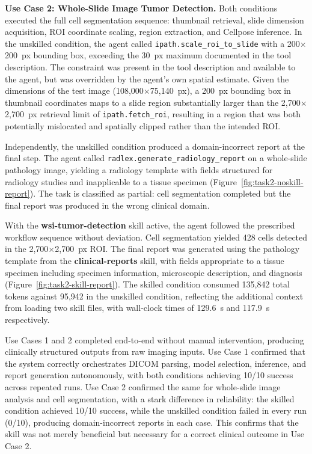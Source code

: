 \documentclass[conference]{IEEEtran}
\begin{document}
\textbf{Use Case 2: Whole-Slide Image Tumor Detection.}
Both conditions executed the full cell segmentation sequence: thumbnail retrieval, slide dimension acquisition, ROI coordinate scaling, region extraction, and Cellpose inference. In the unskilled condition, the agent called \texttt{ipath.scale\_roi\_to\_slide} with a 200$\times$200~px bounding box, exceeding the 30~px maximum documented in the tool description. The constraint was present in the tool description and available to the agent, but was overridden by the agent's own spatial estimate. Given the dimensions of the test image (108,000$\times$75,140~px), a 200~px bounding box in thumbnail coordinates maps to a slide region substantially larger than the 2,700$\times$2,700~px retrieval limit of \texttt{ipath.fetch\_roi}, resulting in a region that was both potentially mislocated and spatially clipped rather than the intended ROI.

Independently, the unskilled condition produced a domain-incorrect report at the final step. The agent called \texttt{radlex.generate\_radiology\_report} on a whole-slide pathology image, yielding a radiology template with fields structured for radiology studies and inapplicable to a tissue specimen (Figure~\ref{fig:task2-noskill-report}). The task is classified as partial: cell segmentation completed but the final report was produced in the wrong clinical domain.

With the \textbf{wsi-tumor-detection} skill active, the agent followed the prescribed workflow sequence without deviation. Cell segmentation yielded 428 cells detected in the 2,700$\times$2,700~px ROI. The final report was generated using the pathology template from the \textbf{clinical-reports} skill, with fields appropriate to a tissue specimen including specimen information, microscopic description, and diagnosis (Figure~\ref{fig:task2-skill-report}). The skilled condition consumed 135,842 total tokens against 95,942 in the unskilled condition, reflecting the additional context from loading two skill files, with wall-clock times of 129.6~s and 117.9~s respectively.

Use Cases 1 and 2 completed end-to-end without manual intervention, producing clinically structured outputs from raw imaging inputs. Use Case 1 confirmed that the system correctly orchestrates DICOM parsing, model selection, inference, and report generation autonomously, with both conditions achieving 10/10 success across repeated runs. Use Case 2 confirmed the same for whole-slide image analysis and cell segmentation, with a stark difference in reliability: the skilled condition achieved 10/10 success, while the unskilled condition failed in every run (0/10), producing domain-incorrect reports in each case. This confirms that the skill was not merely beneficial but necessary for a correct clinical outcome in Use Case 2.
\end{document}
